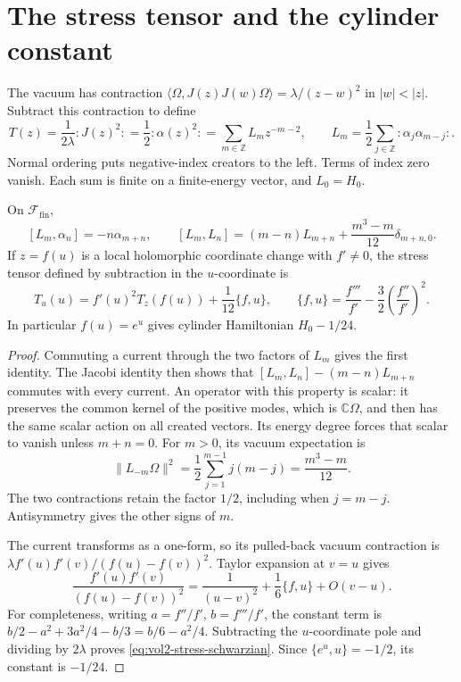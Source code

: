 \section{The stress tensor and the cylinder constant}

The vacuum has contraction
\(\langle\Omega,J(z)J(w)\Omega\rangle=\lambda/(z-w)^2\)
in \(|w|<|z|\). Subtract this contraction to define
\[
 T(z)=\frac1{2\lambda}{:}J(z)^2{:}
     =\frac12{:}\alpha(z)^2{:}
     =\sum_{m\in\mathbb Z}L_mz^{-m-2},
 \qquad
 L_m=\frac12\sum_{j\in\mathbb Z}{:}\alpha_j\alpha_{m-j}{:}.
\]
Normal ordering puts negative-index creators to the left.
Terms of index zero vanish. Each sum is finite on a finite-energy
vector, and \(L_0=H_0\).

\begin{proposition}\label{prop:vol2-current-virasoro}
On \(\mathcal F_{\mathrm{fin}}\),
\[
 [L_m,\alpha_n]=-n\alpha_{m+n},\qquad
 [L_m,L_n]=(m-n)L_{m+n}
       +\frac{m^3-m}{12}\delta_{m+n,0}.
\]
If \(z=f(u)\) is a local holomorphic coordinate change with
\(f'\ne0\), the stress tensor defined by subtraction in the
\(u\)-coordinate is
\begin{equation}\label{eq:vol2-stress-schwarzian}
 T_u(u)=f'(u)^2T_z(f(u))+\frac1{12}\{f,u\},
 \qquad
 \{f,u\}=\frac{f'''}{f'}-\frac32\left(\frac{f''}{f'}\right)^2.
\end{equation}
In particular \(f(u)=e^u\) gives cylinder Hamiltonian
\(H_0-1/24\).
\end{proposition}

\begin{proof}
Commuting a current through the two factors of \(L_m\) gives
the first identity. The Jacobi identity then shows that
\([L_m,L_n]-(m-n)L_{m+n}\) commutes with every current.
An operator with this property is scalar: it preserves the common
kernel of the positive modes, which is \(\mathbb C\Omega\), and
then has the same scalar action on all created vectors.
Its energy degree forces that scalar to vanish unless \(m+n=0\).
For \(m>0\), its vacuum expectation is
\[
 \|L_{-m}\Omega\|^2
 =\frac12\sum_{j=1}^{m-1}j(m-j)
 =\frac{m^3-m}{12}.
\]
The two contractions retain the factor \(1/2\), including when
\(j=m-j\). Antisymmetry gives the other signs of \(m\).

The current transforms as a one-form, so its pulled-back vacuum
contraction is \(\lambda f'(u)f'(v)/(f(u)-f(v))^2\).
Taylor expansion at \(v=u\) gives
\[
 \frac{f'(u)f'(v)}{(f(u)-f(v))^2}
 =\frac1{(u-v)^2}+\frac16\{f,u\}+O(v-u).
\]
For completeness, writing \(a=f''/f'\), \(b=f'''/f'\), the
constant term is \(b/2-a^2+3a^2/4-b/3=b/6-a^2/4\).
Subtracting the \(u\)-coordinate pole and dividing by \(2\lambda\)
proves \eqref{eq:vol2-stress-schwarzian}.
Since \(\{e^u,u\}=-1/2\), its constant is \(-1/24\).
\end{proof}

